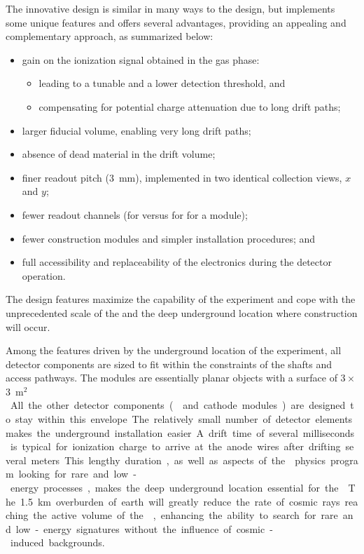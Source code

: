 The innovative  design is similar in many ways to the  design, but implements some unique features and offers several advantages, providing an appealing and complementary approach, as summarized below:

\begin{itemize}
\item gain on the ionization signal obtained in the gas phase:
\begin{itemize}
\item  leading to a tunable  and a lower detection threshold, and
\item  compensating for potential charge attenuation due to long drift paths; 
\end{itemize}
\item  larger fiducial volume, enabling very long drift paths;
\item  absence of dead material in the  drift volume;
\item  finer readout pitch (\SI{3}{mm}), implemented in two identical collection views, $x$ and $y$;
\item  fewer readout channels (\dpnumcrpch for  versus \spnumch for  for a  \nominalmodsize module); 
\item  fewer construction modules and simpler installation procedures; and
\item  full accessibility and replaceability of the  electronics during the detector operation.
\end{itemize}

The  design features maximize the capability of the experiment and cope with the unprecedented scale of the  and the deep underground location where construction will occur.

Among the features driven by the underground location of the experiment, all detector components are sized to fit within the constraints of the  shafts and access pathways. The  modules are essentially planar objects with a surface of \num{3}\,$\times$\,\SI{3}{m$^2$}. All the other detector 
components ( and cathode modules) are  designed to stay within this envelope. The relatively small number of detector elements makes the underground installation easier.

A drift time of several milliseconds is typical for ionization charge to arrive at the anode wires after drifting several meters.  This lengthy duration, as well as aspects of the  physics program looking for rare and low-energy processes, makes the deep underground location essential for the .  The \SI{1.5}{km} overburden of earth will greatly reduce the rate of cosmic rays reaching the active volume of the , enhancing the ability to search for rare and low-energy signatures without the influence of cosmic-induced backgrounds.  


